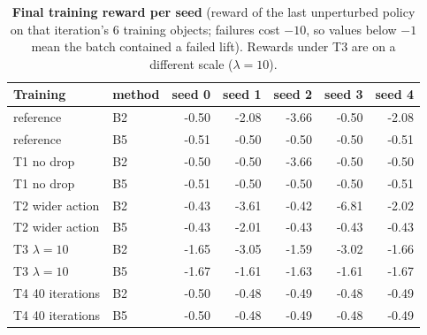 \begin{table}[!htbp]\centering\small
\caption{\textbf{Final training reward per seed} (reward of the last unperturbed policy on that iteration's 6 training
objects; failures cost $-10$, so values below $-1$ mean the batch contained a failed lift). Rewards under T3 are on a different
scale ($\lambda=10$).}\label{tab:trainrows}
\begin{tabular}{@{}llrrrrr@{}}\toprule
Training & method & seed 0 & seed 1 & seed 2 & seed 3 & seed 4\\\midrule
reference & B2 & -0.50 & -2.08 & -3.66 & -0.50 & -2.08\\
reference & B5 & -0.51 & -0.50 & -0.50 & -0.50 & -0.51\\
T1 no drop & B2 & -0.50 & -0.50 & -3.66 & -0.50 & -0.50\\
T1 no drop & B5 & -0.51 & -0.50 & -0.50 & -0.50 & -0.51\\
T2 wider action & B2 & -0.43 & -3.61 & -0.42 & -6.81 & -2.02\\
T2 wider action & B5 & -0.43 & -2.01 & -0.43 & -0.43 & -0.43\\
T3 $\lambda=10$ & B2 & -1.65 & -3.05 & -1.59 & -3.02 & -1.66\\
T3 $\lambda=10$ & B5 & -1.67 & -1.61 & -1.63 & -1.61 & -1.67\\
T4 40 iterations & B2 & -0.50 & -0.48 & -0.49 & -0.48 & -0.49\\
T4 40 iterations & B5 & -0.50 & -0.48 & -0.49 & -0.48 & -0.49\\
\bottomrule\end{tabular}\end{table}